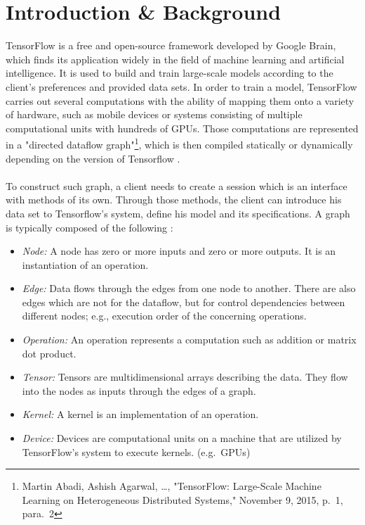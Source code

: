 \documentclass[ieeetran]{article}
\begin{document}
\section{Introduction \& Background} %
\label{sec:introduction}
TensorFlow is a free and open-source framework developed by Google Brain, which finds its application widely in the field of machine learning and artificial intelligence. It is used to build and train large-scale models according to the client's preferences and provided data sets. In order to train a model, TensorFlow carries out several computations with the ability of mapping them onto a variety of hardware, such as mobile devices or systems consisting of multiple computational units with hundreds of GPUs. Those computations are represented in a "directed dataflow graph"\footnote{Martin Abadi, Ashish Agarwal, \ldots, "TensorFlow: Large-Scale Machine Learning on Heterogeneous Distributed Systems," November 9, 2015, p.\ 1, para.\ 2}, which is then compiled statically or dynamically depending on the version of Tensorflow \cite{first}. 
\\ \\To construct such graph, a client needs to create a session which is an interface with methods of its own. Through those methods, the client can introduce his data set to Tensorflow's system, define his model and its specifications. A graph is typically composed of the following \cite{first}:
\begin{itemize}
  \item \textit{Node:} A node has zero or more inputs and zero or more outputs. It is an instantiation of an operation.
\item \textit{Edge:} Data flows through the edges from one node to another. There are also edges which are not for the dataflow, but for control dependencies between different nodes; e.g., execution order of the concerning operations.
\item \textit{Operation:} An operation represents a computation such as addition or matrix dot product.
\item \textit{Tensor:} Tensors are multidimensional arrays describing the data. They flow into the nodes as inputs through the edges of a graph.
\item \textit{Kernel:} A kernel is an implementation of an operation.
\item \textit{Device:} Devices are computational units on a machine that are utilized by TensorFlow's system to execute kernels. (e.g.\ GPUs)
\end{itemize}
\end{document}

